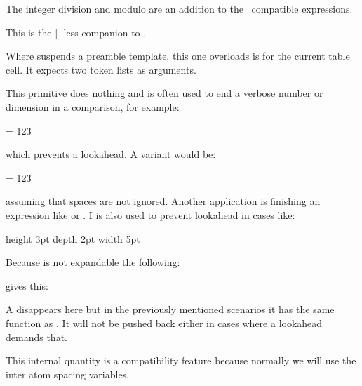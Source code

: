 The integer division \type{:} and modulo \type {;} are an addition to the \ETEX\
compatible expressions.

\stopnewprimitive

\startnewprimitive[title={\prm {rdivideby}}]

This is the |-|less companion to .

\stopnewprimitive

\startnewprimitive[title={\prm {realign}}]

Where  suspends a preamble template, this one overloads is for the
current table cell. It expects two token lists as arguments.

\stopnewprimitive

\startoldprimitive[title={\prm {relax}}]

This primitive does nothing and is often used to end a verbose number or
dimension in a comparison, for example:

\starttyping
\ifnum \scratchcounter = 123\relax
\stoptyping

which prevents a lookahead. A variant would be:

\starttyping
\ifnum \scratchcounter = 123 %
\stoptyping

assuming that spaces are not ignored. Another application is finishing
an expression like \prm {numexpr} or \prm {dimexpr}. I is also used
to prevent lookahead in cases like:

\starttyping
\vrule height 3pt depth 2pt width 5pt\relax
{}\relax
\stoptyping

Because  is not expandable the following:

\startbuffer
\edef\foo{\relax}   \meaningfull\foo
\edef\oof{\norelax} \meaningfull\oof
\stopbuffer

\typebuffer

gives this:

\startlines
\getbuffer
\stoplines

A  disappears here but in the previously mentioned scenarios
it has the same function as \prm {relax}. It will not be pushed back either
in cases where a lookahead demands that.

\stopoldprimitive

\startoldprimitive[title={\prm {relpenalty}}]

This internal quantity is a compatibility feature because normally we will use
the inter atom spacing variables.

